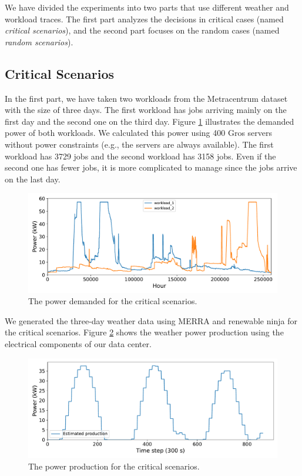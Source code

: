 We have divided the experiments into two parts that use different weather and workload traces. The first part analyzes the decisions in critical cases (named \emph{critical scenarios}), and the second part focuses on the random cases (named \emph{random scenarios}). 

\subsection{Critical Scenarios}

In the first part, we have taken two workloads from the Metracentrum dataset with the size of three days. The first workload has jobs arriving mainly on the first day and the second one on the third day. Figure \ref{fig:critical_workload} illustrates the demanded power of both workloads. We calculated this power using 400 Gros servers without power constraints (e.g., the servers are always available). The first workload has 3729 jobs and the second workload has 3158 jobs. Even if the second one has fewer jobs, it is more complicated to manage since the jobs arrive on the last day.

\begin{figure}[!htb]
    \centering
    \includegraphics[scale=0.58]{Images/Compensations/critical_jobs_arriving.pdf}
    \caption{The power demanded for the critical scenarios.}
    \label{fig:critical_workload}
\end{figure}

We generated the three-day weather data using MERRA \cite{rienecker2011merra} and renewable ninja \cite{pfenninger2016long} for the critical scenarios. Figure \ref{fig:critical_weather} shows the weather power production using the electrical components of our data center. 

\begin{figure}[!htb]
    \centering
    \includegraphics[scale=0.58]{Images/Compensations/critical_power_production.pdf}
    \caption{The power production for the critical scenarios.}
    \label{fig:critical_weather}
\end{figure}

